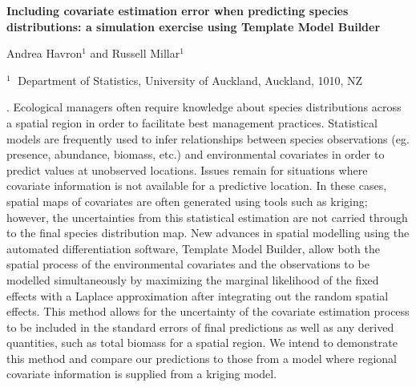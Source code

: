 \documentclass[12pt]{article}
\begin{document}
\begin{flushleft}


{\LARGE\bf  Including covariate estimation error when predicting species distributions: a simulation exercise using Template Model Builder}


\vspace{1.0cm}

Andrea Havron$^1$ and Russell Millar$^1$

\begin{description}

\item $^1 \;$ Department of Statistics, University of Auckland,
Auckland, 1010, NZ


\end{description}

\end{flushleft}


\vspace{0.75cm}

. Ecological managers often require knowledge about species distributions across a spatial region in order to facilitate best management practices. Statistical models are frequently used to infer relationships between species observations (eg. presence, abundance, biomass, etc.) and environmental covariates in order to predict values at unobserved locations. Issues remain for situations where covariate information is not available for a predictive location. In these cases, spatial maps of covariates are often generated using tools such as kriging; however, the uncertainties from this statistical estimation are not carried through to the final species distribution map. New advances in spatial modelling using the automated differentiation software, Template Model Builder, allow both the spatial process of the environmental covariates and the observations to be modelled simultaneously by maximizing the marginal likelihood of the fixed effects with a Laplace approximation after integrating out the random spatial effects. This method allows for the uncertainty of the covariate estimation process to be included in the standard errors of final predictions as well as any derived quantities, such as total biomass for a spatial region. We intend to demonstrate this method and compare our predictions to those from a model where regional covariate information is supplied from a kriging model.
\vskip 2mm
\end{document}
